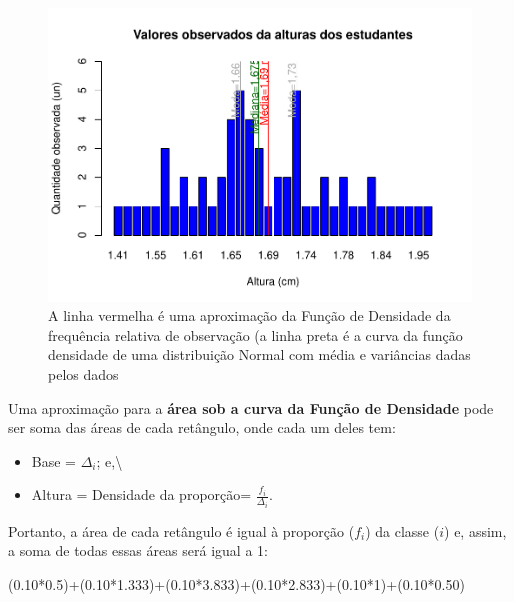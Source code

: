 \documentclass[
]{book}
\newenvironment{Shaded}{\begin{snugshade}}{\end{snugshade}}
\newcommand{\DecValTok}[1]{\textcolor[rgb]{0.00,0.00,0.81}{#1}}
\newcommand{\FloatTok}[1]{\textcolor[rgb]{0.00,0.00,0.81}{#1}}
\newcommand{\NormalTok}[1]{#1}
\newcommand{\SpecialCharTok}[1]{\textcolor[rgb]{0.00,0.00,0.00}{#1}}
\providecommand{\tightlist}{%
  \setlength{\itemsep}{0pt}\setlength{\parskip}{0pt}}
\begin{document}
\begin{figure}
\centering
\includegraphics{apostila_files/figure-latex/unnamed-chunk-45-1.pdf}
\caption{\label{fig:unnamed-chunk-45}A linha vermelha é uma aproximação da Função de Densidade da frequência relativa de observação (a linha preta é a curva da função densidade de uma distribuição Normal com média e variâncias dadas pelos dados}
\end{figure}

\hfill\break

Uma aproximação para a \textbf{área sob a curva da Função de Densidade} pode ser soma das áreas de cada retângulo, onde cada um deles tem:

\hfill\break

\begin{itemize}
\tightlist
\item
  Base = \(\Delta_{i}\); e,\textbackslash{}
\item
  Altura = Densidade da proporção= \(\frac{f_{i}}{\Delta_{i}}\).
\end{itemize}

\hfill\break

Portanto, a área de cada retângulo é igual à proporção (\(f_{i}\)) da classe (\(i\)) e, assim, a soma de todas essas áreas será igual a 1:

\hfill\break

\begin{Shaded}
\begin{Highlighting}[]
\NormalTok{(}\FloatTok{0.10}\SpecialCharTok{*}\FloatTok{0.5}\NormalTok{)}\SpecialCharTok{+}\NormalTok{(}\FloatTok{0.10}\SpecialCharTok{*}\FloatTok{1.333}\NormalTok{)}\SpecialCharTok{+}\NormalTok{(}\FloatTok{0.10}\SpecialCharTok{*}\FloatTok{3.833}\NormalTok{)}\SpecialCharTok{+}\NormalTok{(}\FloatTok{0.10}\SpecialCharTok{*}\FloatTok{2.833}\NormalTok{)}\SpecialCharTok{+}\NormalTok{(}\FloatTok{0.10}\SpecialCharTok{*}\DecValTok{1}\NormalTok{)}\SpecialCharTok{+}\NormalTok{(}\FloatTok{0.10}\SpecialCharTok{*}\FloatTok{0.50}\NormalTok{)}
\end{Highlighting}
\end{Shaded}
\end{document}

